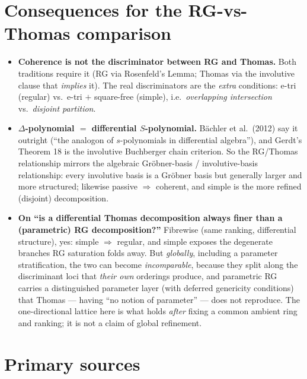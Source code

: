 \documentclass[11pt]{article}
\begin{document}
\section{Consequences for the RG-vs-Thomas comparison}

\begin{itemize}
  \item \textbf{Coherence is not the discriminator between RG and Thomas.} Both
        traditions require it (RG via Rosenfeld's Lemma; Thomas via the
        involutive clause that \emph{implies} it). The real discriminators are
        the \emph{extra} conditions: e-tri (regular) vs.\ e-tri $+$ square-free
        (simple), i.e.\ \emph{overlapping intersection} vs.\ \emph{disjoint
        partition}.
  \item \textbf{$\Delta$-polynomial $=$ differential $S$-polynomial.} B\"achler
        et al.\ (2012) say it outright (``the analogon of $s$-polynomials in
        differential algebra''), and Gerdt's Theorem 18 is the involutive
        Buchberger chain criterion. So the RG/Thomas relationship mirrors the
        algebraic Gr\"obner-basis / involutive-basis relationship: every
        involutive basis is a Gr\"obner basis but generally larger and more
        structured; likewise passive $\Rightarrow$ coherent, and simple is the
        more refined (disjoint) decomposition.
  \item \textbf{On ``is a differential Thomas decomposition always finer than a
        (parametric) RG decomposition?''} Fibrewise (same ranking, differential
        structure), yes: simple $\Rightarrow$ regular, and simple exposes the
        degenerate branches RG saturation folds away. But \emph{globally},
        including a parameter stratification, the two can become
        \emph{incomparable}, because they split along the discriminant loci that
        \emph{their own} orderings produce, and parametric RG carries a
        distinguished parameter layer (with deferred genericity conditions) that
        Thomas --- having ``no notion of parameter'' --- does not reproduce. The
        one-directional lattice here is what holds \emph{after} fixing a common
        ambient ring and ranking; it is not a claim of global refinement.
\end{itemize}

\section{Primary sources}
\end{document}
